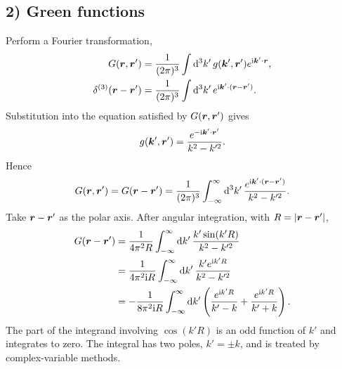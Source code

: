 \subsection*{2) Green functions}
Perform a Fourier transformation,
\begin{equation}\begin{aligned}
G(\bm{r},\bm{r}')&=\frac1{(2\pi)^3}\int\mathrm{d}^3k'\,g(\bm{k}',\bm{r}')e^{\mathrm{i}\bm{k}'\cdot\bm{r}},\\
\delta^{(3)}(\bm{r}-\bm{r}')&=\frac1{(2\pi)^3}\int\mathrm{d}^3k'\,e^{\mathrm{i}\bm{k}'\cdot(\bm{r}-\bm{r}')}.
\end{aligned}\end{equation}
Substitution into the equation satisfied by $G(\bm{r},\bm{r}')$ gives
\begin{equation}
g(\bm{k}',\bm{r}')=\frac{e^{-\mathrm{i}\bm{k}'\cdot\bm{r}'}}{k^2-k'^2}.
\end{equation}
Hence
\begin{equation}
G(\bm{r},\bm{r}')=G(\bm{r}-\bm{r}')
=\frac1{(2\pi)^3}\int_{-\infty}^{\infty}\mathrm{d}^3k'\,
\frac{e^{\mathrm{i}\bm{k}'\cdot(\bm{r}-\bm{r}')}}{k^2-k'^2}.
\end{equation}
Take $\bm{r}-\bm{r}'$ as the polar axis. After angular integration, with $R=|\bm{r}-\bm{r}'|$,
\begin{equation}\begin{aligned}
G(\bm{r}-\bm{r}')
&=\frac1{4\pi^2R}\int_{-\infty}^{\infty}\mathrm{d} k'\,
 \frac{k'\sin(k'R)}{k^2-k'^2}\\
&=\frac1{4\pi^2\mathrm{i} R}\int_{-\infty}^{\infty}\mathrm{d} k'\,
\frac{k'e^{\mathrm{i} k'R}}{k^2-k'^2}\\
&=-\frac1{8\pi^2\mathrm{i} R}\int_{-\infty}^{\infty}\mathrm{d} k'
\left(\frac{e^{\mathrm{i} k'R}}{k'-k}+\frac{e^{\mathrm{i} k'R}}{k'+k}\right).
\end{aligned}\end{equation}
The part of the integrand involving $\cos(k'R)$ is an odd function of $k'$ and integrates to zero. The integral has two poles, $k'=\pm k$, and is treated by complex-variable methods.

